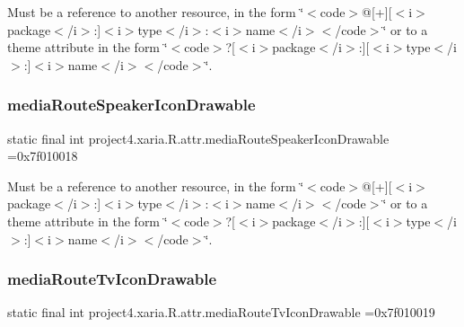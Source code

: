 Must be a reference to another resource, in the form \char`\"{}$<$code$>$@\mbox{[}+\mbox{]}\mbox{[}$<$i$>$package$<$/i$>$\+:\mbox{]}$<$i$>$type$<$/i$>$\+:$<$i$>$name$<$/i$>$$<$/code$>$\char`\"{} or to a theme attribute in the form \char`\"{}$<$code$>$?\mbox{[}$<$i$>$package$<$/i$>$\+:\mbox{]}\mbox{[}$<$i$>$type$<$/i$>$\+:\mbox{]}$<$i$>$name$<$/i$>$$<$/code$>$\char`\"{}. \mbox{\label{classproject4_1_1xaria_1_1R_1_1attr_a17be683bf27daf7f1bba7357c771e37c}} 
\subsubsection{\texorpdfstring{media\+Route\+Speaker\+Icon\+Drawable}{mediaRouteSpeakerIconDrawable}}
{\footnotesize\ttfamily static final int project4.\+xaria.\+R.\+attr.\+media\+Route\+Speaker\+Icon\+Drawable =0x7f010018\hspace{0.3cm}{\ttfamily [static]}}

Must be a reference to another resource, in the form \char`\"{}$<$code$>$@\mbox{[}+\mbox{]}\mbox{[}$<$i$>$package$<$/i$>$\+:\mbox{]}$<$i$>$type$<$/i$>$\+:$<$i$>$name$<$/i$>$$<$/code$>$\char`\"{} or to a theme attribute in the form \char`\"{}$<$code$>$?\mbox{[}$<$i$>$package$<$/i$>$\+:\mbox{]}\mbox{[}$<$i$>$type$<$/i$>$\+:\mbox{]}$<$i$>$name$<$/i$>$$<$/code$>$\char`\"{}. \mbox{\label{classproject4_1_1xaria_1_1R_1_1attr_a493552bc8e3f9418ee812a67d41bfaac}} 
\subsubsection{\texorpdfstring{media\+Route\+Tv\+Icon\+Drawable}{mediaRouteTvIconDrawable}}
{\footnotesize\ttfamily static final int project4.\+xaria.\+R.\+attr.\+media\+Route\+Tv\+Icon\+Drawable =0x7f010019\hspace{0.3cm}{\ttfamily [static]}}

